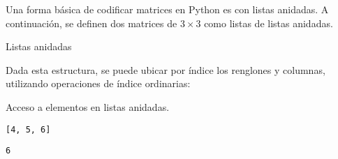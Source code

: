 Una forma básica de codificar matrices en Python es con listas anidadas.
A continuación, se definen dos matrices de \(3\times 3\) como listas de
listas anidadas.\\

\begin{code} Listas anidadas

\begin{Shaded}
\begin{Highlighting}[]
\OperatorTok{=}\NormalTok{ [}
\NormalTok{    [}\NormalTok{, }\NormalTok{, }\NormalTok{],}
\NormalTok{    [}\NormalTok{, }\NormalTok{, }\NormalTok{],}
\NormalTok{    [}\NormalTok{, }\NormalTok{, }\NormalTok{]}
\NormalTok{]}
\OperatorTok{=}\NormalTok{ [}
\NormalTok{    [}\NormalTok{, }\NormalTok{, }\NormalTok{], }
\NormalTok{    [}\NormalTok{, }\NormalTok{, }\NormalTok{],}
\NormalTok{    [}\NormalTok{, }\NormalTok{, }\NormalTok{]}
\NormalTok{]}
\end{Highlighting}
\end{Shaded}
\end{code}

Dada esta estructura, se puede ubicar por índice los renglones y columnas, utilizando operaciones de índice ordinarias:\\

\begin{code} Acceso a elementos en listas anidadas.

  \begin{Shaded}
\begin{Highlighting}[]
\NormalTok{M[}\NormalTok{]}
\end{Highlighting}
\end{Shaded}

\begin{verbatim}
[4, 5, 6]
\end{verbatim}

\begin{Shaded}
\begin{Highlighting}[]
\NormalTok{M[}\NormalTok{][}\NormalTok{]}
\end{Highlighting}
\end{Shaded}

\begin{verbatim}
6
\end{verbatim}
\end{code}

